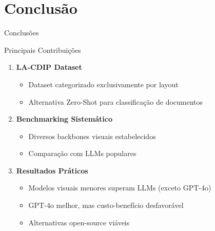 \section{Conclusão}

\begin{frame}{Conclusões}
\begin{block}{Principais Contribuições}
\begin{enumerate}
    \item \textbf{LA-CDIP Dataset}
    \begin{itemize}
        \item Dataset categorizado exclusivamente por layout
        \item Alternativa Zero-Shot para classificação de documentos
    \end{itemize}
    
    \item \textbf{Benchmarking Sistemático}
    \begin{itemize}
        \item Diversos backbones visuais estabelecidos
        \item Comparação com LLMs populares
    \end{itemize}
    
    \item \textbf{Resultados Práticos}
    \begin{itemize}
        \item Modelos visuais menores superam LLMs (exceto GPT-4o)
        \item GPT-4o melhor, mas custo-benefício desfavorável
        \item Alternativas open-source viáveis
    \end{itemize}
\end{enumerate}
\end{block}
\end{frame}

